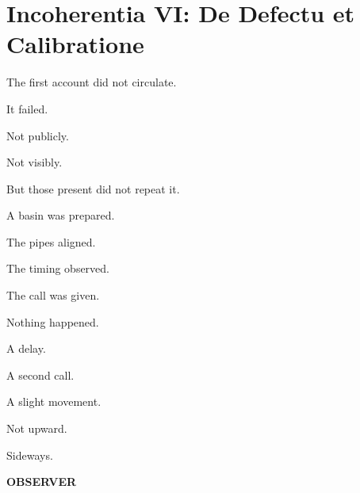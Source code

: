 
\chapter*{Incoherentia VI: De Defectu et Calibratione}


The first account did not circulate.

It failed.

\medskip

Not publicly.

Not visibly.

\medskip

But those present did not repeat it.

\medskip

A basin was prepared.

The pipes aligned.

The timing observed.

\medskip

The call was given.

\medskip

Nothing happened.

\medskip

A delay.

\medskip


\medskip

A second call.

\medskip

A slight movement.

Not upward.

\medskip

Sideways.

\medskip

\textbf{OBSERVER}

